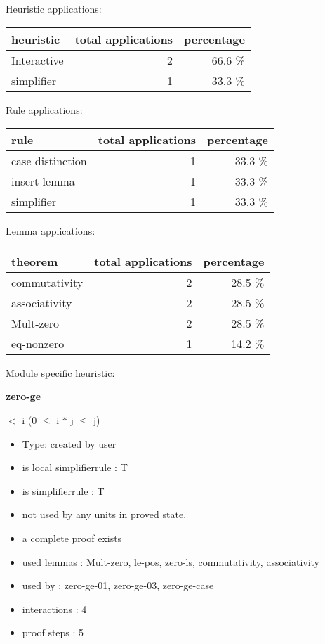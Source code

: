 \documentclass[a4paper]{article}
\begin{document}
\medskip


Heuristic applications:

\begin{supertabular}{l|r|r}
heuristic	& total applications & percentage \\ \hline
Interactive & 2 & 66.6 \% \\
simplifier & 1 & 33.3 \% \\

\end{supertabular}

Rule applications:

\begin{supertabular}{l|r|r}
rule	        & total applications & percentage \\ \hline
case distinction & 1 & 33.3 \% \\
insert lemma & 1 & 33.3 \% \\
simplifier & 1 & 33.3 \% \\

\end{supertabular}

Lemma applications:

\begin{supertabular}{l|r|r}
theorem	        & total applications & percentage \\ \hline
commutativity & 2 & 28.5 \% \\
associativity & 2 & 28.5 \% \\
Mult-zero & 2 & 28.5 \% \\
eq-nonzero & 1 & 14.2 \% \\

\end{supertabular}

Module specific heuristic:

\pagebreak

{\LARGE\bf zero-ge}\label{lemma-zero-ge}

\medskip

  $<$ i \Imp (0 $\le$ i $*$ j  $\le$ j)

\begin{itemize}

\item Type: created by user

\item is local simplifierrule : T
\item is simplifierrule : T
\item not used by any units in proved state.
\item       a complete proof exists
\item       used lemmas  : Mult-zero, le-pos, zero-ls, commutativity, associativity
\item       used by      : zero-ge-01, zero-ge-03, zero-ge-case
\item       interactions : 4
\item       proof steps  : 5
\end{itemize}
\end{document}

